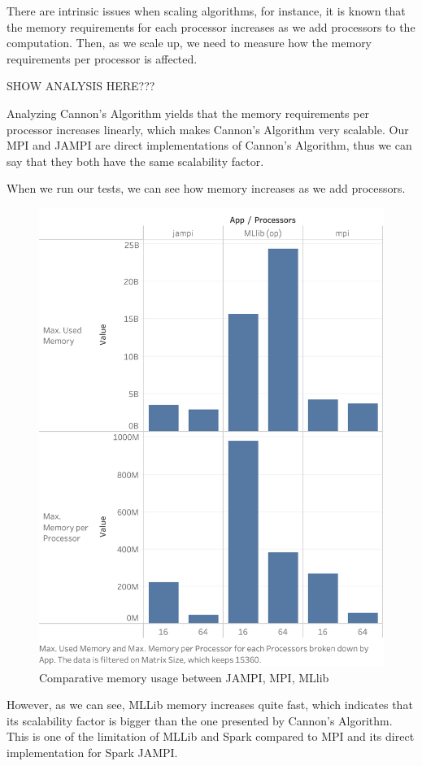 \documentclass[fleqn,10pt]{SelfArx} %
\begin{document}
There are intrinsic issues when scaling algorithms, for instance, it is known that the memory requirements for each processor increases as we add processors to the computation. Then, as we scale up, we need to measure how the memory requirements per processor is affected.

SHOW ANALYSIS HERE???

Analyzing Cannon's Algorithm yields that the memory requirements per processor increases linearly, which makes Cannon's Algorithm very scalable. Our MPI and JAMPI are direct implementations of Cannon's Algorithm, thus we can say that they both have the same scalability factor. 

When we run our tests, we can see how memory increases as we add processors. 

\begin{figure}
	\centering
	\includegraphics[width=0.9\linewidth]{figures/memory.png}
	\vspace{14pt}
	\caption{Comparative memory usage between JAMPI, MPI, MLlib}
\end{figure}

However, as we can see, MLLib memory increases quite fast, which indicates that its scalability factor is bigger than the one presented by Cannon's Algorithm. This is one of the limitation of MLLib and Spark compared to MPI and its direct implementation for Spark JAMPI. 
\end{document}
